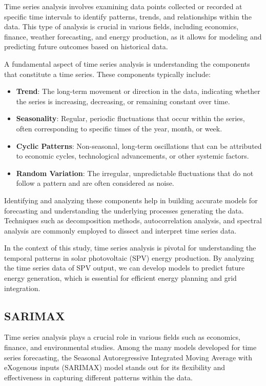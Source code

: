 \documentclass[a4paper,12pt]{article}
\begin{document}
Time series analysis involves examining data points collected or recorded at specific time intervals to identify patterns, trends, and relationships within the data. This type of analysis is crucial in various fields, including economics, finance, weather forecasting, and energy production, as it allows for modeling and predicting future outcomes based on historical data.

A fundamental aspect of time series analysis is understanding the components that constitute a time series. These components typically include:

\begin{itemize}
    \item \textbf{Trend}: The long-term movement or direction in the data, indicating whether the series is increasing, decreasing, or remaining constant over time.
    \item \textbf{Seasonality}: Regular, periodic fluctuations that occur within the series, often corresponding to specific times of the year, month, or week.
    \item \textbf{Cyclic Patterns}: Non-seasonal, long-term oscillations that can be attributed to economic cycles, technological advancements, or other systemic factors.
    \item \textbf{Random Variation}: The irregular, unpredictable fluctuations that do not follow a pattern and are often considered as noise.
\end{itemize}

Identifying and analyzing these components help in building accurate models for forecasting and understanding the underlying processes generating the data. Techniques such as decomposition methods, autocorrelation analysis, and spectral analysis are commonly employed to dissect and interpret time series data.

In the context of this study, time series analysis is pivotal for understanding the temporal patterns in solar photovoltaic (SPV) energy production. By analyzing the time series data of SPV output, we can develop models to predict future energy generation, which is essential for efficient energy planning and grid integration.

\subsection{SARIMAX}

Time series analysis plays a crucial role in various fields such as economics, finance, and environmental studies. Among the many models developed for time series forecasting, the Seasonal Autoregressive Integrated Moving Average with eXogenous inputs (SARIMAX) model stands out for its flexibility and effectiveness in capturing different patterns within the data.
\end{document}
